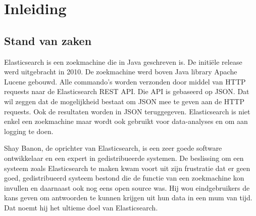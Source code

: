 
\chapter{Inleiding}
\label{ch:inleiding}

\section{Stand van zaken}
\label{sec:stand-van-zaken}

Elasticsearch is een zoekmachine die in Java geschreven is. De initiële release werd uitgebracht in 2010. De zoekmachine werd boven Java library Apache Lucene gebouwd. Alle commando's worden verzonden door middel van HTTP requests naar de Elasticsearch REST API. Die API is gebaseerd op JSON. Dat wil zeggen dat de mogelijkheid bestaat om JSON mee te geven aan de HTTP requests. Ook de resultaten worden in JSON teruggegeven. Elasticsearch is niet enkel een zoekmachine maar wordt ook gebruikt voor data-analyses en om aan logging te doen.

Shay Banon, de oprichter van Elasticsearch, is een zeer goede software ontwikkelaar en een expert in gedistribueerde systemen. De beslissing om een systeem zoals Elasticsearch te maken kwam voort uit zijn frustratie dat er geen goed, gedistribueerd systeem bestond die de functie van een zoekmachine kon invullen en daarnaast ook nog eens open source was. Hij wou eindgebruikers de kans geven om antwoorden te kunnen krijgen uit hun data in een mum van tijd. Dat noemt hij het ultieme doel van Elasticsearch.

